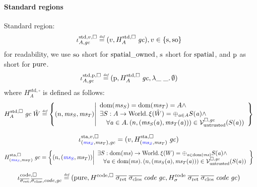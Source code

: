 \paragraph{Standard regions}
\label{par:standard-regions}
Standard region:
\[
  \stdreg{A,\gc}{v} \defeq (v,H_A^{\mathrm{std},\square} \; \gc) , v \in \{\spa,\spao\}
\]
for readability, we use $\spao$ short for $\spatialo$, $\spa$ short for $\spatial$, and $\pur$ as short for $\pure$.
\[
  \stdreg{A,\gc}{\pur} \defeq (\pur,H_A^{\mathrm{std},\square} \; \gc, \lambda \_ \; \_ \ldotp \emptyset)
\]
where $H^{\mathrm{std},\square}_A$ is defined as follows:
\[
  H_A^{\mathrm{std},\square} \; \gc \; \hat{W} \defeq \left\{ \npair{\ms_S,\ms_T} \middle|
    \begin{array}{l}
      \dom(\ms_S) = \dom(\ms_T) = A \wedge \\
      \exists S : A \fun \World \ldotp \xi(\hat{W}) = \oplus_{\aaddr \in A} S(\aaddr) \wedge\\
      \quad \forall \aaddr \in A \ldotp \npair{(\ms_S(\aaddr),\ms_T(\aaddr))} \in \lrv(S(\aaddr))
    \end{array}
  \right\}
\]

\[
  \stareg[\stpair{\ms}{\ms},\gc]{v,\square} = (v,H^\mathrm{sta,\square}_{\stpair{\ms}{\ms}} \; \gc)
\]
\[
  H^\mathrm{sta,\square}_{\stpair{\ms}{\ms}} \; \gc = \left\{ \npair{\stpair{\ms}{\ms}} \middle| 
    \begin{array}{l}
      \exists S : \dom(\ms) \fun \World \ldotp \xi(W) = \oplus_{\aaddr \in \dom(\ms)} S(\aaddr) \wedge\\
      \quad \forall \aaddr \in \dom(\ms) \ldotp \npair{(\ms_S(\aaddr),\ms_T(\aaddr))} \in \lrv(S(\aaddr))
    \end{array}
\right\}
\]


\[
  \codereg{\sigrets,\sigcloss,\code,\gc} \defeq (\pure,
H^\mathrm{code,\square} \; \sigrets \; \sigcloss \; \code \; \gc,
H^\mathrm{code}_\sigma \; \sigrets \; \sigcloss \; \code \; \gc)
\]

